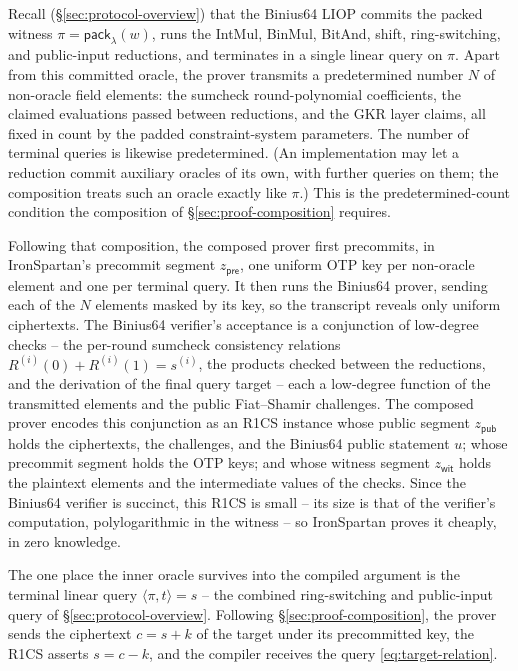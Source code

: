 \documentclass{article}
\theoremstyle{definition}
\begin{document}
Recall (\S\ref{sec:protocol-overview}) that the Binius64 LIOP commits the packed witness $\pi = \textsf{pack}_\lambda(w)$, runs the IntMul, BinMul, BitAnd, shift, ring-switching, and public-input reductions, and terminates in a single linear query on $\pi$. Apart from this committed oracle, the prover transmits a predetermined number $N$ of non-oracle field elements: the sumcheck round-polynomial coefficients, the claimed evaluations passed between reductions, and the GKR layer claims, all fixed in count by the padded constraint-system parameters. The number of terminal queries is likewise predetermined. (An implementation may let a reduction commit auxiliary oracles of its own, with further queries on them; the composition treats such an oracle exactly like $\pi$.) This is the predetermined-count condition the composition of \S\ref{sec:proof-composition} requires.

Following that composition, the composed prover first precommits, in IronSpartan's precommit segment $z_{\textsf{pre}}$, one uniform OTP key per non-oracle element and one per terminal query. It then runs the Binius64 prover, sending each of the $N$ elements masked by its key, so the transcript reveals only uniform ciphertexts. The Binius64 verifier's acceptance is a conjunction of low-degree checks -- the per-round sumcheck consistency relations $R^{(i)}(0) + R^{(i)}(1) = s^{(i)}$, the products checked between the reductions, and the derivation of the final query target -- each a low-degree function of the transmitted elements and the public Fiat--Shamir challenges. The composed prover encodes this conjunction as an R1CS instance whose public segment $z_{\textsf{pub}}$ holds the ciphertexts, the challenges, and the Binius64 public statement $u$; whose precommit segment holds the OTP keys; and whose witness segment $z_{\textsf{wit}}$ holds the plaintext elements and the intermediate values of the checks. Since the Binius64 verifier is succinct, this R1CS is small -- its size is that of the verifier's computation, polylogarithmic in the witness -- so IronSpartan proves it cheaply, in zero knowledge.

The one place the inner oracle survives into the compiled argument is the terminal linear query $\langle \pi, t \rangle = s$ -- the combined ring-switching and public-input query of \S\ref{sec:protocol-overview}. Following \S\ref{sec:proof-composition}, the prover sends the ciphertext $c = s + k$ of the target under its precommitted key, the R1CS asserts $s = c - k$, and the compiler receives the query \eqref{eq:target-relation}.
\end{document}

